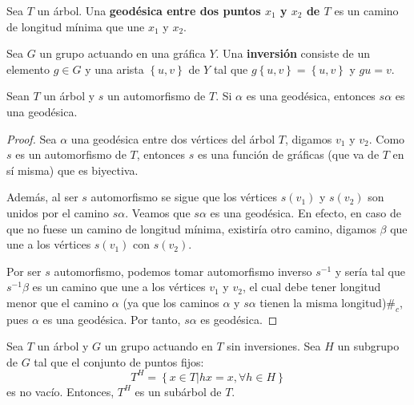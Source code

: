 \documentclass[12pt]{report}
\newcounter{it}
\theoremstyle{largebreak}
\newcommand\contradiction{\ensuremath{\#_c}}
\begin{document}
    \begin{mydef}
        Sea $T$ un árbol. Una \textbf{geodésica entre dos puntos $x_1$ y $x_2$ de $T$} es un camino de longitud mínima que une $x_1$ y $x_2$.
    \end{mydef}

    \begin{mydef}
        Sea $G$ un grupo actuando en una gráfica $Y$. Una \textbf{inversión} consiste de un elemento $g\in G$ y una arista $\left\{u,v \right\}$ de $Y$ tal que $g\left\{u,v\right\}=\left\{u,v \right\}$ y $gu=v$.
    \end{mydef}

    \begin{excer}
        Sean $T$ un árbol y $s$ un automorfismo de $T$. Si $\alpha$ es una geodésica, entonces $s\alpha$ es una geodésica.
    \end{excer}

    \begin{proof}
        Sea $\alpha$ una geodésica entre dos vértices del árbol $T$, digamos $v_1$ y $v_2$. Como $s$ es un automorfismo de $T$, entonces $s$ es una función de gráficas (que va de $T$ en sí misma) que es biyectiva.
        
        Además, al ser $s$ automorfismo se sigue que los vértices $s(v_1)$ y $s(v_2)$ son unidos por el camino $s\alpha$. Veamos que $s\alpha$ es una geodésica. En efecto, en caso de que no fuese un camino de longitud mínima, existiría otro camino, digamos $\beta$ que une a los vértices $s(v_1)$ con $s(v_2)$.

        Por ser $s$ automorfismo, podemos tomar automorfismo inverso $s^{-1}$ y sería tal que $s^{-1}\beta$ es un camino que une a los vértices $v_1$ y $v_2$, el cual debe tener longitud menor que el camino $\alpha$ (ya que los caminos $\alpha$ y $s\alpha$ tienen la misma longitud)\contradiction, pues $\alpha$ es una geodésica. Por tanto, $s\alpha$ es geodésica.
    \end{proof}

    \begin{excer}
        Sea $T$ un árbol y $G$ un grupo actuando en $T$ sin inversiones. Sea $H$ un subgrupo de $G$ tal que el conjunto de puntos fijos:
        \begin{equation*}
            T^H=\left\{x\in T\Big|hx=x,\forall h\in H \right\}
        \end{equation*}
        es no vacío. Entonces, $T^H$ es un subárbol de $T$.
    \end{excer}
\end{document}
